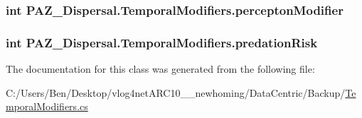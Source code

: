 \hypertarget{class_p_a_z___dispersal_1_1_temporal_modifiers_a0395bc1bfa1a3803f5ef6a7ec3ac6d94}{
\subsubsection[{percepton\-Modifier}]{\setlength{\rightskip}{0pt plus 5cm}int P\-A\-Z\-\_\-\-Dispersal.\-Temporal\-Modifiers.\-percepton\-Modifier}}\label{class_p_a_z___dispersal_1_1_temporal_modifiers_a0395bc1bfa1a3803f5ef6a7ec3ac6d94}
\hypertarget{class_p_a_z___dispersal_1_1_temporal_modifiers_a291c6b8b495422e9b980ed9833a78da4}{
\subsubsection[{predation\-Risk}]{\setlength{\rightskip}{0pt plus 5cm}int P\-A\-Z\-\_\-\-Dispersal.\-Temporal\-Modifiers.\-predation\-Risk}}\label{class_p_a_z___dispersal_1_1_temporal_modifiers_a291c6b8b495422e9b980ed9833a78da4}


The documentation for this class was generated from the following file\-:\begin{DoxyCompactItemize}
\item 
C\-:/\-Users/\-Ben/\-Desktop/vlog4net\-A\-R\-C10\-\_\-\_\-newhoming/\-Data\-Centric/\-Backup/\hyperlink{_backup_2_temporal_modifiers_8cs}{Temporal\-Modifiers.\-cs}\end{DoxyCompactItemize}
